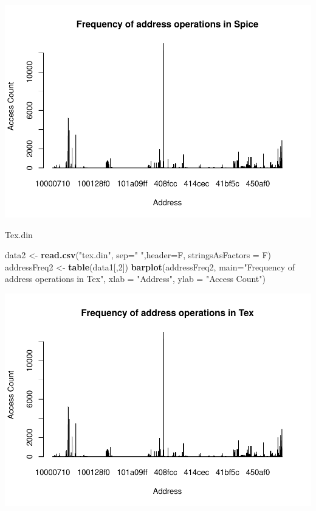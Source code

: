 \documentclass[
]{article}
\newenvironment{Shaded}{\begin{snugshade}}{\end{snugshade}}
\newcommand{\DataTypeTok}[1]{\textcolor[rgb]{0.13,0.29,0.53}{#1}}
\newcommand{\DecValTok}[1]{\textcolor[rgb]{0.00,0.00,0.81}{#1}}
\newcommand{\KeywordTok}[1]{\textcolor[rgb]{0.13,0.29,0.53}{\textbf{#1}}}
\newcommand{\NormalTok}[1]{#1}
\newcommand{\StringTok}[1]{\textcolor[rgb]{0.31,0.60,0.02}{#1}}
\begin{document}
\includegraphics{muhammad-umar-hw1-cs402_files/figure-latex/unnamed-chunk-1-1.pdf}

Tex.din

\begin{Shaded}
\begin{Highlighting}[]
\NormalTok{data2 <-}\StringTok{ }\KeywordTok{read.csv}\NormalTok{(}\StringTok{"tex.din"}\NormalTok{, }\DataTypeTok{sep=}\StringTok{" "}\NormalTok{,}\DataTypeTok{header=}\NormalTok{F, }\DataTypeTok{stringsAsFactors =}\NormalTok{ F)}
\NormalTok{addressFreq2 <-}\StringTok{ }\KeywordTok{table}\NormalTok{(data1[,}\DecValTok{2}\NormalTok{])}
\KeywordTok{barplot}\NormalTok{(addressFreq2, }\DataTypeTok{main=}\StringTok{"Frequency of address operations in Tex"}\NormalTok{, }
        \DataTypeTok{xlab =} \StringTok{"Address"}\NormalTok{, }\DataTypeTok{ylab =} \StringTok{"Access Count"}\NormalTok{)}
\end{Highlighting}
\end{Shaded}

\includegraphics{muhammad-umar-hw1-cs402_files/figure-latex/unnamed-chunk-2-1.pdf}
\end{document}
